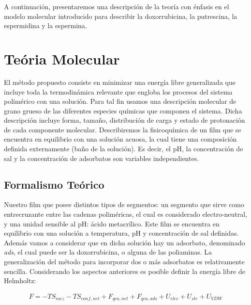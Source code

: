 A continuaci\'on, presentaremos una descripci\'on de la teor\'ia con \'enfasis en el modelo molecular introducido para describir la doxorrubicina, la putrescina, la espermidina y la espermina.


\section{Te\'oria Molecular } \label{sec:film-teoria}

El m\'etodo propuesto consiste en minimizar una energ\'ia libre generalizada que incluye toda la termodin\'amica relevante que engloba los procesos del sistema polim\'erico con una soluci\'on. Para tal fin  usamos  una descripci\'on molecular de grano grueso de las diferentes especies qu\'imicas que componen el sistema.
Dicha descripci\'on incluye forma, tama\~no, distribuci\'on de carga  y estado de protonaci\'on de cada componente molecular.
Describiremos la fisicoqu\'imica de un film  que  se encuentra en  equilibrio con una soluci\'on acuosa, la cual  tiene una composici\'on  definida externamente (ba\~no de la soluci\'on).
Es decir, el pH, la concentraci\'on de sal y la concentraci\'on de adsorbatos son variables independientes.

\subsection{Formalismo Te\'orico}
Nuestro film que posee distintos tipos de segmentos: un segmento que sirve como entrecruzante entre las cadenas polim\'ericas, el cual es considerado electro-neutral, y  una unidad sensible al pH:  \'acido metacr\'ilico.
Este film  se encuentra en equilibrio con una soluci\'on a temperatura, pH y concentraci\'on de sal definidas. Adem\'as vamos a considerar que en dicha soluci\'on hay un adsorbato, denominado \textit{ads}, el cual puede ser la doxorrubicina, o alguna de las poliaminas.
La generalizaci\'on del m\'etodo para incorporar dos o m\'as adsorbatos es relativamente sencilla.
Considerando los aspectos anteriores es posible definir la energ\'ia libre de Helmholtz:

\begin{align}
 	F = -TS_{mez} -TS_{conf,net} + F_{qca,net} + F_{qca,ads} + U_{elec} + U_{ste} + U_{VDW}
 	\label{eq:film:libre-film}
\end{align}
 
